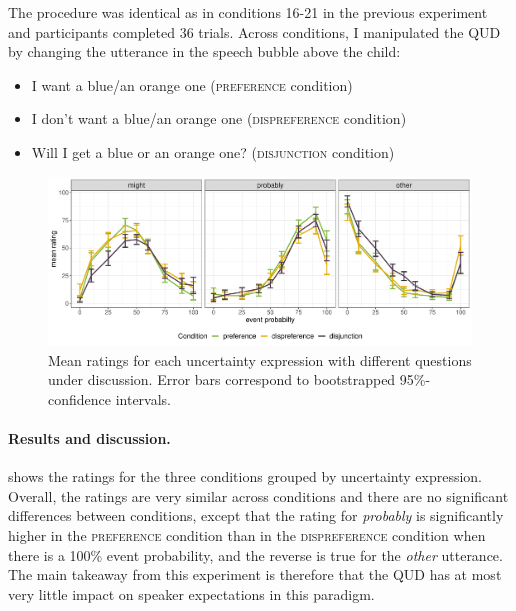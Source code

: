The procedure was identical as in conditions 16-21 in the previous experiment and participants
completed 36 trials. Across conditions, I manipulated the QUD by changing the utterance in
the speech bubble above the child:
\begin{itemize}
\item I want a blue/an orange one (\textsc{preference} condition)
\item I don't want a blue/an orange one  (\textsc{dispreference} condition)
\item Will I get a blue or an orange one? (\textsc{disjunction} condition)
\end{itemize}

\begin{figure}
\includegraphics[width=\textwidth]{plots/pre-test-qud.pdf}
\caption{Mean ratings for each uncertainty expression with different questions under discussion. Error bars correspond to bootstrapped 95\%-confidence intervals. \label{fig:norning-qud}}
\end{figure}


\paragraph{Results and discussion.}  shows the ratings for the three conditions grouped by uncertainty expression. Overall, the ratings
are very similar across conditions and there are no significant differences between conditions, except that the rating for \emph{probably} is significantly
higher in the \textsc{preference} condition than in the \textsc{dispreference} condition when there is a 100\% event probability, and the reverse is true for
the \emph{other} utterance. The main takeaway from this experiment is therefore that the QUD has at most very little impact on speaker expectations in
this paradigm. 

